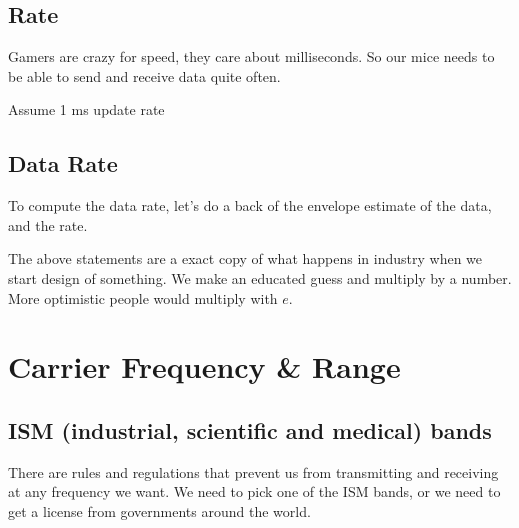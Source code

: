 \subsection{Rate}\label{rate}

Gamers are crazy for speed, they care about milliseconds. So our mice
needs to be able to send and receive data quite often.

Assume 1 ms update rate

\subsection{Data Rate}\label{data-rate-1}

To compute the data rate, let's do a back of the envelope estimate of
the data, and the rate.

\begin{Shaded}
\begin{Highlighting}[]
\OperatorTok{\textgreater{}}


\OperatorTok{\textgreater{}}

\OperatorTok{\textgreater{}}

\end{Highlighting}
\end{Shaded}

The above statements are a exact copy of what happens in industry when
we start design of something. We make an educated guess and multiply by
a number. More optimistic people would multiply with \(e\).

\section{Carrier Frequency \& Range}\label{carrier-frequency-range}

\subsection{ISM (industrial, scientific and medical)
bands}\label{ism-industrial-scientific-and-medical-bands}

There are rules and regulations that prevent us from transmitting and
receiving at any frequency we want. We need to pick one of the ISM
bands, or we need to get a license from governments around the world.

